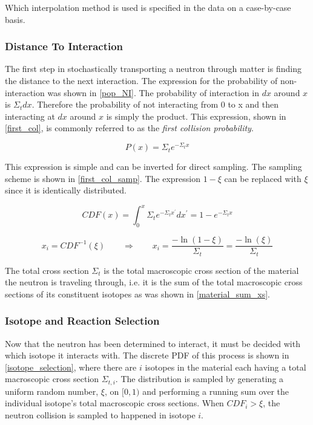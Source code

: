  Which interpolation method is used is specified in the data on a case-by-case basis.

\subsubsection{Distance To Interaction}

The first step in stochastically transporting a neutron through matter is finding the distance to the next interaction.  The expression for the probability of non-interaction was shown in \eqref{pop_NI}.  The probability of interaction in $dx$ around $x$ is $\Sigma_t dx$.  Therefore the probability of not interacting from 0 to x and then interacting at $dx$ around $x$ is simply the product.  This expression, shown in \eqref{first_col}, is commonly referred to as the \emph{first collision probability}.

\begin{equation}
\label{first_col}
P(x) = \Sigma_t e^{- \Sigma_t  x}
\end{equation}

This expression is simple and can be inverted for direct sampling.  The sampling scheme is shown in \eqref{first_col_samp}.  The expression $1-\xi$ can be replaced with $\xi$ since it is identically distributed.

\begin{equation}
\label{first_col}
CDF(x) = \int_0^x \Sigma_t e^{- \Sigma_t  x^\prime} dx^\prime = 1- e^{- \Sigma_t  x} 
\end{equation}

\begin{equation}
\label{first_col_samp}
x_i=CDF^{-1}(\xi) \qquad \Rightarrow \qquad x_i=\frac{-\ln(1-\xi) }{\Sigma_t}=\frac{-\ln(\xi) }{\Sigma_t}
\end{equation}

The total cross section $\Sigma_t$ is the total macroscopic cross section of the material the neutron is traveling through, i.e. it is the sum of the total macroscopic cross sections of its constituent isotopes as was shown in \eqref{material_sum_xs}.

\subsubsection{Isotope and Reaction Selection}

Now that the neutron has been determined to interact, it must be decided with which isotope it interacts with.  The discrete PDF of this process is shown in \eqref{isotope_selection}, where there are $i$ isotopes in the material each having a total macroscopic cross section $\Sigma_{t,i}$.  The distribution is sampled by generating a uniform random number, $\xi$, on $[0,1)$ and performing a running sum over the individual isotope's total macroscopic cross sections.  When $CDF_i > \xi$, the neutron collision is sampled to happened in isotope $i$.

